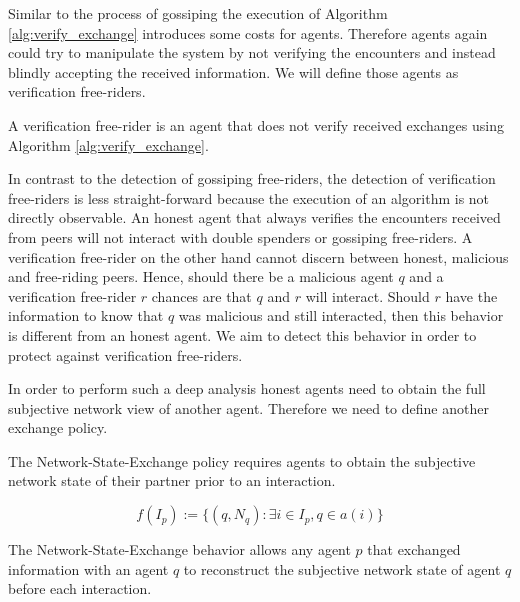 Similar to the process of gossiping the execution of Algorithm \ref{alg:verify_exchange} introduces
some costs for agents. Therefore agents again could try to manipulate the system by not verifying 
the encounters and instead blindly accepting the received information. We will define those agents
as verification free-riders.

\begin{defn}
    A verification free-rider is an agent that does not verify received exchanges using Algorithm 
    \ref{alg:verify_exchange}.
\end{defn}

In contrast to the detection of gossiping free-riders, the detection of verification free-riders is
less straight-forward because the execution of an algorithm is not directly observable. An honest agent
that always verifies the encounters received from peers will not interact with double spenders or 
gossiping free-riders. A verification free-rider on the other hand cannot discern between honest,
malicious and free-riding peers. Hence, should there be a malicious agent $q$ and a verification 
free-rider $r$ chances are that $q$ and $r$ will interact. Should $r$ have the information to know 
that $q$ was malicious and still interacted, then this behavior is different from an honest agent.
We aim to detect this behavior in order to protect against verification free-riders.

In order to perform such a deep analysis honest agents need to obtain the full subjective network 
view of another agent. Therefore we need to define another exchange policy.

\begin{pol}
    \label{pol:network_state}
    The Network-State-Exchange policy requires agents to obtain the subjective network state of their partner 
    prior to an interaction. 

    \[ f(I_p) := \{ (q, N_q) : \exists i \in I_p, q \in a(i) \}\]
\end{pol}

The Network-State-Exchange behavior allows any agent $p$ that exchanged information with an agent $q$
to reconstruct the subjective network state of agent $q$ before each interaction. 



